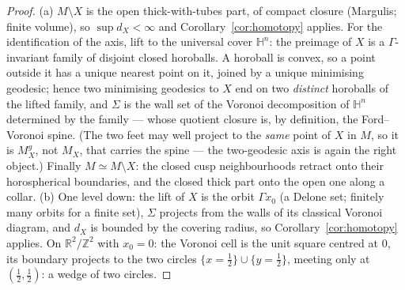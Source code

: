 \documentclass[11pt]{article}
\theoremstyle{remark}
\newcommand{\R}{\mathbb{R}}
\newcommand{\X}{X}
\newcommand{\Mx}{M_{\X}}
\newcommand{\Mg}{M^{g}_{\X}}
\newcommand{\dX}{d_{\X}}
\newcommand{\HH}{\mathbb{H}}
\begin{document}
\begin{proof}
(a) $M\setminus\X$ is the open thick-with-tubes part, of compact
closure (Margulis; finite volume), so $\sup\dX<\infty$ and
Corollary~\ref{cor:homotopy} applies. For the identification of
the axis, lift to the universal cover $\HH^{n}$: the preimage of
$\X$ is a $\Gamma$-invariant family of disjoint closed horoballs.
A horoball is convex, so a point outside it has a unique nearest
point on it, joined by a unique minimising geodesic; hence two
minimising geodesics to $\X$ end on two \emph{distinct} horoballs
of the lifted family, and $\Sigma$ is the wall set of the Voronoi
decomposition of $\HH^{n}$ determined by the family --- whose
quotient closure is, by definition, the Ford--Voronoi spine. (The
two feet may well project to the \emph{same} point of $\X$ in $M$,
so it is $\Mg$, not $\Mx$, that carries the spine --- the
two-geodesic axis is again the right object.) Finally
$M\simeq M\setminus\X$: the closed cusp neighbourhoods retract
onto their horospherical boundaries, and the closed thick part
onto the open one along a collar. (b) One level down: the lift of
$\X$ is the orbit $\Gamma x_{0}$ (a Delone set; finitely many
orbits for a finite set), $\Sigma$ projects from the walls of its
classical Voronoi diagram, and $\dX$ is bounded by the covering
radius, so Corollary~\ref{cor:homotopy} applies. On
$\R^{2}/\mathbb{Z}^{2}$ with $x_{0}=0$: the Voronoi cell is the unit
square centred at $0$, its boundary projects to the two circles
$\{x=\tfrac12\}\cup\{y=\tfrac12\}$, meeting only at
$(\tfrac12,\tfrac12)$: a wedge of two circles.
\end{proof}
\end{document}
